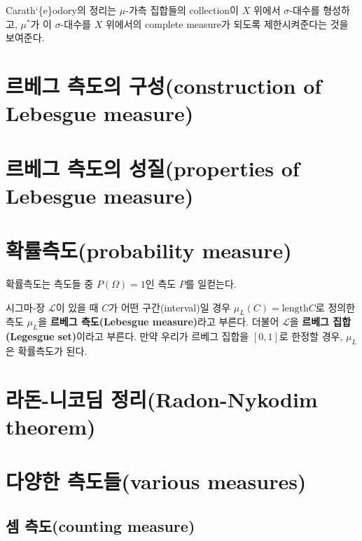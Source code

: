 \documentclass[b5paper,]{scrbook}
\theoremstyle{plain}
\theoremstyle{definition}
\numberwithin{equation}{section}
\let\BeginKnitrBlock\begin \let\EndKnitrBlock\end
\begin{document}
Carath`\{e\}odory의 정리는 \(\mu\)-가측 집합들의 collection이 \(X\) 위에서 \(\sigma\)-대수를 형성하고, \(\mu^{*}\)가 이 \(\sigma\)-대수를 \(X\) 위에서의 complete measure가 되도록 제한시켜준다는 것을 보여준다.

\hypertarget{--construction-of-lebesgue-measure}{%
\section{르베그 측도의 구성(construction of Lebesgue measure)}\label{--construction-of-lebesgue-measure}}

\hypertarget{--properties-of-lebesgue-measure}{%
\section{르베그 측도의 성질(properties of Lebesgue measure)}\label{--properties-of-lebesgue-measure}}

\hypertarget{probability-measure}{%
\section{확률측도(probability measure)}\label{probability-measure}}

확률측도는 측도들 중 \(P(\Omega)=1\)인 측도 \(P\)를 일컫는다.

\BeginKnitrBlock{definition}[르베그 측도]
\protect\hypertarget{def:unnamed-chunk-56}{}{\label{def:unnamed-chunk-56} {} }시그마-장 \(\mathcal{L}\)이 있을 때 \(C\)가 어떤 구간(interval)일 경우 \(\mu_{L}(C)=\text{length}C\)로 정의한 측도 \(\mu_{L}\)을 \textbf{르베그 측도(Lebesgue measure)}라고 부른다. 더불어 \(\mathcal{L}\)을 \textbf{르베그 집합(Legesgue set)}이라고 부른다. 만약 우리가 르베그 집합을 \([0,1]\)로 한정할 경우, \(\mu_{L}\)은 확률측도가 된다.
\EndKnitrBlock{definition}

\hypertarget{--radon-nykodim-theorem}{%
\section{라돈-니코딤 정리(Radon-Nykodim theorem)}\label{--radon-nykodim-theorem}}

\hypertarget{-various-measures}{%
\section{다양한 측도들(various measures)}\label{-various-measures}}

\hypertarget{-counting-measure}{%
\subsection{셈 측도(counting measure)}\label{-counting-measure}}
\end{document}
